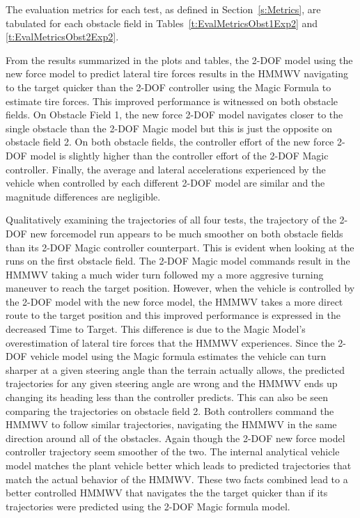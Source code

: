 \documentclass[12pt,onecolumn]{report}
\begin{document}
The evaluation metrics for each test, as defined in Section~\ref{s:Metrics}, are tabulated for each obstacle field in Tables~\ref{t:EvalMetricsObst1Exp2} and \ref{t:EvalMetricsObst2Exp2}. 

From the results summarized in the plots and tables, the 2-DOF model using the new force model to predict lateral tire forces results in the HMMWV navigating to the target quicker than the 2-DOF controller using the Magic Formula to estimate tire forces. This improved performance is witnessed on both obstacle fields. On Obstacle Field 1, the new force 2-DOF model navigates closer to the single obstacle than the 2-DOF Magic model but this is just the opposite on obstacle field 2. On both obstacle fields, the controller effort of the new force 2-DOF model is slightly higher than the controller effort of the 2-DOF Magic controller. Finally, the average and lateral accelerations experienced by the vehicle when controlled by each different 2-DOF model are similar and the magnitude differences are negligible. 

Qualitatively examining the trajectories of all four tests, the trajectory of the 2-DOF new forcemodel run appears to be much smoother on both obstacle fields than its 2-DOF Magic controller counterpart. This is evident when looking at the runs on the first obstacle field. The 2-DOF Magic model commands result in the HMMWV taking a much wider turn followed my a more aggresive turning maneuver to reach the target position. However, when the vehicle is controlled by the 2-DOF model with the new force model, the HMMWV takes a more direct route to the target position and this improved performance is expressed in the decreased Time to Target. This difference is due to the Magic Model's overestimation of lateral tire forces that the HMMWV experiences. Since the 2-DOF vehicle model using the Magic formula estimates the vehicle can turn sharper at a given steering angle than the terrain actually allows, the predicted trajectories for any given steering angle are wrong and the HMMWV ends up changing its heading less than the controller predicts. This can also be seen comparing the trajectories on obstacle field 2. Both controllers command the HMMWV to follow similar trajectories, navigating the HMMWV in the same direction around all of the obstacles. Again though the 2-DOF new force model controller trajectory seem smoother of the two. The internal analytical vehicle model matches the plant vehicle better which leads to predicted trajectories that match the actual behavior of the HMMWV. These two facts combined lead to a better controlled HMMWV that navigates the the target quicker than if its trajectories were predicted using the 2-DOF Magic formula model. 
\end{document}
